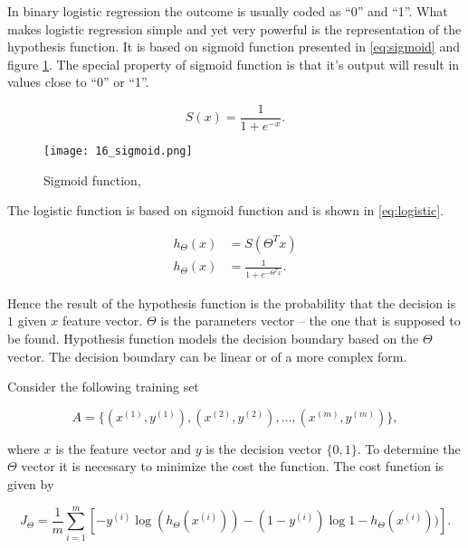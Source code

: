 In binary logistic regression the outcome is usually coded as ``0'' and ``1''. What makes logistic regression simple and yet very powerful is the representation of the hypothesis function. It is based on sigmoid function presented in \eqref{eq:sigmoid} and figure \ref{fig:sigmoid}. The special property of sigmoid function is that it's output will result in values close to ``0'' or ``1''.

\begin{equation}\label{eq:sigmoid}
 S(x) = \frac{1}{1 + e^{-x}}.
\end{equation}

\begin{figure}[!ht]
\centering
  \texttt{[image: 16\_sigmoid.png]}
\caption{Sigmoid function, \cite{sigmoid}}
\label{fig:sigmoid}
\end{figure}

The logistic function is based on sigmoid function and is shown in \eqref{eq:logistic}.

\begin{equation}\label{eq:logistic}
\begin{split}
 h_{\Theta}(x) &= S(\Theta^T x) \\
 h_{\Theta}(x) &= \frac{1}{1 + e^{-\Theta^T x}}.
\end{split}
\end{equation}

Hence the result of the hypothesis function is the probability that the decision is $1$ given $x$ feature vector. $\Theta$ is the parameters vector -- the one that is supposed to be found. Hypothesis function models the decision boundary based on the $\Theta$ vector. The decision boundary can be linear or of a more complex form.

Consider the following training set

\begin{equation}
 A = \{(x^{(1)}, y^{(1)}), (x^{(2)}, y^{(2)}), \ldots , (x^{(m)}, y^{(m)})\},
\end{equation}

\noindent
where $x$ is the feature vector and $y$ is the decision vector $\{0, 1\}$. To determine the $\Theta$ vector it is necessary to minimize the cost the function. The cost function is given by

\begin{equation}
 J_{\Theta} =\frac{1}{m} \sum_{i = 1}^{m} [-y^{(i)} \log{(h_{\Theta}(x^{(i)})) - (1 - y^{(i)}) \log{1 - h_{\Theta}(x^{(i)}))}}].
\end{equation}

